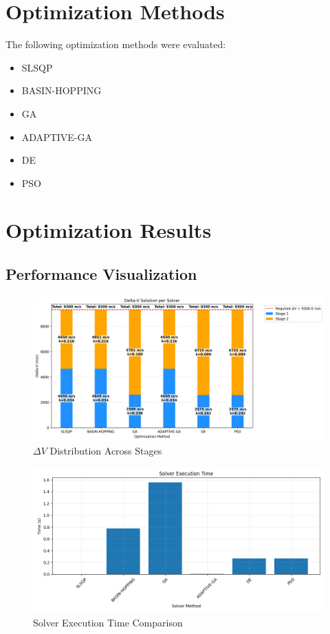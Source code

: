 \documentclass{article}
\begin{document}
\section{Optimization Methods}
The following optimization methods were evaluated:
\begin{itemize}
\item SLSQP
\item BASIN-HOPPING
\item GA
\item ADAPTIVE-GA
\item DE
\item PSO
\end{itemize}

\section{Optimization Results}
\subsection{Performance Visualization}
\begin{figure}[H]
\centering
\includegraphics[width=\textwidth]{dv_breakdown.png}
\caption{$\Delta V$ Distribution Across Stages}
\end{figure}

\begin{figure}[H]
\centering
\includegraphics[width=\textwidth]{execution_time.png}
\caption{Solver Execution Time Comparison}
\end{figure}
\end{document}
